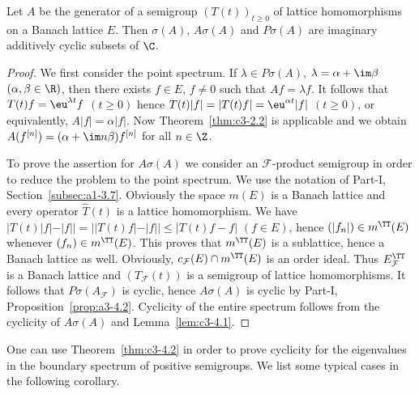 \begin{theorem}\label{thm:c3-4.2}
	Let $A$ be the generator of a semigroup $(T(t))_{t \geq 0}$ of lattice homomorphisms on a Banach lattice $E$. 
	Then $\sigma(A)$, $A\sigma(A)$ and $P\sigma(A)$ are imaginary additively cyclic subsets of\/ $\C $.
\end{theorem}

\begin{proof}
	We first consider the point spectrum. 
	If\/ $\lambda \in P\sigma(A)$, $\lambda = \alpha + \im\beta$ $(\alpha,\beta \in \R )$, then there exists $f \in E$, $f \neq 0$ such that $Af = \lambda f$. 
	It follows that $T(t)f = \eu^{\lambda t}f$ $(t \geq 0)$ hence $T(t)|f| = |T(t)f| = \eu^{\alpha t}|f|$ $(t \geq 0)$, or equivalently, $A|f| = \alpha|f|$. 
	Now Theorem~\ref{thm:c3-2.2} is applicable and we obtain $A(f^{[n]}) = (\alpha + \im n\beta)f^{[n]}$ for all $n \in \Z$.
	
	To prove the assertion for $A\sigma(A)$ we consider an $\mathcal{F}$-product semigroup%
    in order to reduce the problem to the point spectrum. 
	We use the notation of Part-I, Section~\ref{subsec:a1-3.7}. 
	Obviously the space $m(E)$ is a Banach lattice and every operator $\hat{T}(t)$ is a lattice homomorphism. 
	We have $|T(t)|f| - |f|| = ||T(t)f| - |f|| \leq |T(t)f - f|$ $(f \in E)$, hence $(|f_{n}|) \in m^{\TT}(E)$ whenever $(f_{n}) \in m^{\TT}(E)$. 
	This proves that $m^{\TT}(E)$ is a sublattice, hence a Banach lattice as well. 
	Obviously, $c_{\mathcal{F}}(E)\cap m^{\TT}(E)$ is an order ideal. 
	Thus $E_{\mathcal{F}}^{\TT}$ is a Banach lattice and $(T_{\mathcal{F}}(t))$ is a semigroup of lattice homomorphisms. 
	It follows that $P\sigma(A_{\mathcal{F}})$ is cyclic, hence $A\sigma(A)$ is cyclic by Part-I, Proposition~\ref{prop:a3-4.2}.
Cyclicity of the entire spectrum follows from the cyclicity of\/ $A\sigma(A)$ and Lemma~\ref{lem:c3-4.1}.
\end{proof}

One can use Theorem~\ref{thm:c3-4.2} in order to prove cyclicity for the eigenvalues in the boundary spectrum of positive semigroups. 
We list some typical cases in the following corollary.

